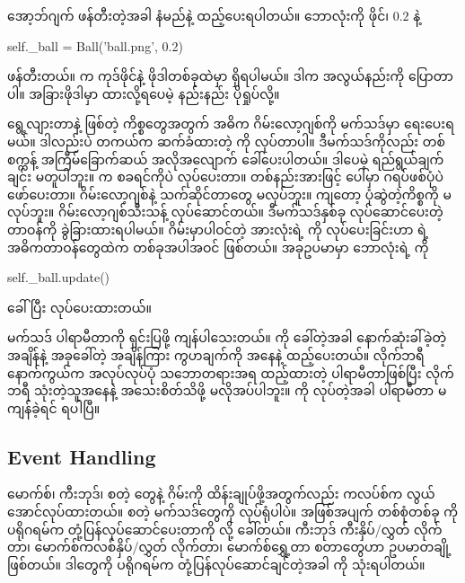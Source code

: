  အော့ဘ်ဂျက် ဖန်တီးတဲ့အခါ  နံမည်နဲ့  ထည့်ပေးရပါတယ်။ ဘောလုံးကို  ဖိုင်၊  $0.2$ နဲ့ 
%
\begin{py}
self._ball = Ball('ball.png', 0.2)
\end{py}
%
ဖန်တီးတယ်။   က ကုဒ်ဖိုင်နဲ့ ဖိုဒါတစ်ခုထဲမှာ ရှိရပါမယ်။ ဒါက အလွယ်နည်းကို ပြောတာပါ။ အခြားဖိုဒါမှာ ထားလို့ရပေမဲ့ နည်းနည်း ပိုရှုပ်လို့။

 ရွေ့လျားတာနဲ့  ဖြစ်တဲ့ ကိစ္စတွေအတွက် အဓိက ဂိမ်းလော့ဂျစ်ကို   မက်သဒ်မှာ ရေးပေးရမယ်။ ဒါလည်းပဲ တကယ်က ဆက်ခံထားတဲ့  ကို   လုပ်တာပါ။  ဒီမက်သဒ်ကိုလည်း တစ်စက္ကန့် အကြီမ်ခြောက်ဆယ် အလိုအလျောက် ခေါ်ပေးပါတယ်။ ဒါပေမဲ့   ရည်ရွယ်ချက်ချင်း မတူပါဘူး။  က စခရင်ကိုပဲ  လုပ်ပေးတာ။ တစ်နည်းအားဖြင့်  ပေါ်မှာ ဂရပ်ဖစ်ပုံပဲ ဖော်ပေးတာ။ ဂိမ်းလော့ဂျစ်နဲ့ သက်ဆိုင်တာတွေ မလုပ်ဘူး။  ကျတော့ ပုံဆွဲတဲ့ကိစ္စကို မလုပ်ဘူး။ ဂိမ်းလော့ဂျစ်သီးသန့် လုပ်ဆောင်တယ်။ ဒီမက်သဒ်နှစ်ခု လုပ်ဆောင်ပေးတဲ့ တာဝန်ကို ခွဲခြားထားရပါမယ်။ ဂိမ်းမှာပါဝင်တဲ့  အားလုံးရဲ့  ကို  လုပ်ပေးခြင်းဟာ  ရဲ့ အဓိကတာဝန်တွေထဲက တစ်ခုအပါအဝင် ဖြစ်တယ်။ အခုဥပမာမှာ ဘောလုံးရဲ့  ကို
%
\begin{py}
self._ball.update()
\end{py}
%
ခေါ်ပြီး  လုပ်ပေးထားတယ်။

 မက်သဒ်  ပါရာမီတာကို ရှင်းပြဖို့ ကျန်ပါသေးတယ်။  ကို ခေါ်တဲ့အခါ နောက်ဆုံးခါ်ခဲ့တဲ့ အချိန်နဲ့ အခုခေါ်တဲ့ အချိန်ကြား ကွဟချက်ကို  အနေနဲ့ ထည့်ပေးတယ်။  လိုက်ဘရီ နောက်ကွယ်က အလုပ်လုပ်ပုံ သဘောတရားအရ ထည့်ထားတဲ့ ပါရာမီတာဖြစ်ပြီး လိုက်ဘရီ သုံးတဲ့သူအနေနဲ့ အသေးစိတ်သိဖို့ မလိုအပ်ပါဘူး။  ကို  လုပ်တဲ့အခါ  ပါရာမီတာ မကျန်ခဲ့ရင် ရပါပြီ။


\subsection*{Event Handling}
မောက်စ်၊ ကီးဘုဒ်၊  စတဲ့  တွေနဲ့ ဂိမ်းကို ထိန်းချုပ်ဖို့အတွက်လည်း  ကလပ်စ်က လွယ်အောင်လုပ်ထားတယ်။ \fEn{,} \fEn{,}  စတဲ့ မက်သဒ်တွေကို  လုပ်ရုံပါပဲ။ အဖြစ်အပျက် တစ်စုံတစ်ခု  ကို ပရိုဂရမ်က တုံ့ပြန်လုပ်ဆောင်‌ပေးတာကို  လို့ ခေါ်တယ်။ ကီးဘုဒ် ကီးနှိပ်/လွှတ် လိုက်တာ၊ မောက်စ်ကလစ်နှိပ်/လွှတ် လိုက်တာ၊ မောက်စ်ရွှေ့တာ စတာတွေဟာ  ဥပမာတချို့ ဖြစ်တယ်။ ဒါတွေကို ပရိုဂရမ်က တုံ့ပြန်လုပ်ဆောင်ချင်တဲ့အခါ  ကို သုံးရပါတယ်။

